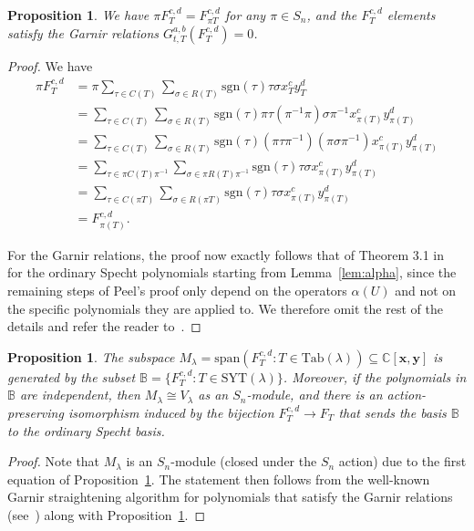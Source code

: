 \documentclass[11pt]{article}
\newtheorem{prop}[theo]{Proposition}
\theoremstyle{definition}
\numberwithin{equation}{section}
\newcommand{\SYT}{\mathrm{SYT}}
\newcommand{\sgn}{\mathrm{sgn}}
\newcommand{\Tab}{\mathrm{Tab}}
\begin{document}
\begin{prop}\label{prop:Garnir}
	We have $\pi F_T^{c,d} = F_{\pi T}^{c,d}$ for any $\pi\in S_n$, and the $F_T^{c,d}$ elements satisfy the Garnir relations  $G^{a,b}_{t,T}(F_T^{c,d})=0$.
\end{prop}

\begin{proof}
	We have 
	\begin{align*}
	\pi F_T^{c,d} &= \pi \sum_{\tau \in C(T)}\sum_{\sigma \in R(T)}\sgn(\tau) \tau \sigma x_T^cy_T^d\\
	&= \sum_{\tau\in C(T)}\sum_{\sigma\in R(T)}\sgn(\tau)\pi\tau(\pi^{-1}\pi)\sigma\pi^{-1}x_{\pi(T)}^c y_{\pi(T)}^d \\
	&= \sum_{\tau\in C(T)}\sum_{\sigma\in R(T)}\sgn(\tau)(\pi\tau\pi^{-1})(\pi\sigma\pi^{-1})x_{\pi(T)}^c y_{\pi(T)}^d \\
	&= \sum_{\tau\in \pi C(T)\pi^{-1}}\sum_{\sigma\in \pi R(T)\pi^{-1}}\sgn(\tau)\tau \sigma x_{\pi(T)}^c y_{\pi(T)}^d \\
	&= \sum_{\tau\in C(\pi T)}\sum_{\sigma\in R(\pi T)}\sgn(\tau)\tau \sigma x_{\pi(T)}^c y_{\pi(T)}^d \\
	&= F^{c,d}_{\pi(T)}.
	\end{align*}  
	
	For the Garnir relations, the proof now exactly follows that of Theorem 3.1 in~\cite{Peel} for the ordinary Specht polynomials starting from Lemma~\ref{lem:alpha}, since the remaining steps of Peel's proof only depend on the operators $\alpha(U)$ and not on the specific polynomials they are applied to.  We therefore omit the rest of the details and refer the reader to~\cite{Peel}.
\end{proof}

\begin{prop}\label{prop:irreducible}
	The subspace $M_\lambda=\mathrm{span}(F_T^{c,d}:T\in \Tab(\lambda))\subseteq \mathbb{C}[\mathbf{x},\mathbf{y}]$ is generated by the subset $\mathbb{B}=\{F_T^{c,d}:T\in \SYT(\lambda)\}$.  Moreover, if the polynomials in $\mathbb{B}$ are independent, then $M_\lambda\cong V_\lambda$ as an $S_n$-module, and there is an action-preserving isomorphism induced by the bijection $F_T^{c,d}\to F_T$ that sends the basis $\mathbb{B}$ to the ordinary Specht basis.
\end{prop}

\begin{proof}
	Note that $M_\lambda$
	is an $S_n$-module (closed under the $S_n$ action) due to the first equation of Proposition~\ref{prop:Garnir}. 
	The statement then follows from the well-known Garnir straightening algorithm for polynomials that satisfy the Garnir relations (see~\cite{Sagan}) along with Proposition~\ref{prop:Garnir}.
\end{proof}
\end{document}
